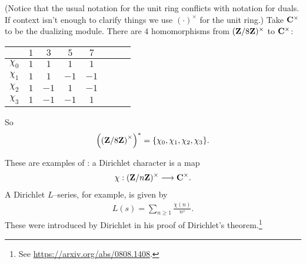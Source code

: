 \documentclass[11pt, oneside,margin=1in]{article}
\begin{document}
\begin{example}\label{}
	(Notice that the usual notation for the unit ring conflicts with notation for duals. If context isn't enough to clarify things we use $(\cdot)^\times$ for the unit ring.) Take $\mathbf C^\times$ to be the dualizing module. There are $4$ homomorphisms from $(\mathbf Z / 8\mathbf Z) ^\times$ to $\mathbf C^\times$:
	\begin{center}
\begin{tabular}{cccccccc}
    & $1$ & $3$ & $5$ & $7$\\
    \midrule
	$\chi_0$ & $1$ & $1$ & $1$ & $1$\\
	$\chi_1$ & $1$ & $1$ & $-1$ & $-1$\\
$\chi_2$ & $1$ & $-1$ & $1$ & $-1$\\
$\chi_3$ & $1$ & $-1$ & $-1$ & $1$\\

\end{tabular}
\end{center}
So
\begin{align*}
	\left( \left( \mathbf Z / 8\mathbf Z \right) ^\times \right) ^* = \{\chi_0,\chi_1,\chi_2,\chi_3\}.
\end{align*}
\end{example}

These are examples of : a Dirichlet character is a map
 \begin{align*}
	\chi : (\mathbf Z / n\mathbf Z) ^\times \longrightarrow \mathbf C^\times.
\end{align*}
A Dirichlet $L$--series, for example, is given by
\begin{align*}
	L(s)=\sum_{n\ge 1} \frac{\chi(n)}{n^s}.
\end{align*}
These were introduced by Dirichlet in his proof of Dirichlet's theorem.\footnote{See \url{https://arxiv.org/abs/0808.1408}.}
\end{document}
